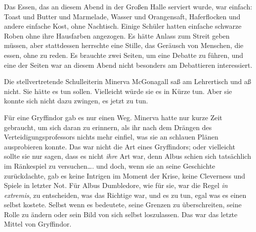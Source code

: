 Das Essen, das an diesem Abend in der Großen Halle serviert wurde, war einfach: Toast und Butter und Marmelade, Wasser und Orangensaft, Haferflocken und andere einfache Kost, ohne Nachtisch. Einige Schüler hatten einfache schwarze Roben ohne ihre Hausfarben angezogen. Es hätte Anlass zum Streit geben müssen, aber stattdessen herrschte eine Stille, das Geräusch von Menschen, die essen, ohne zu reden. Es brauchte zwei Seiten, um eine Debatte zu führen, und eine der Seiten war an diesem Abend nicht besonders am Debattieren interessiert.

Die stellvertretende Schulleiterin Minerva McGonagall saß am Lehrertisch und aß nicht. Sie hätte es tun sollen. Vielleicht würde sie es in Kürze tun. Aber sie konnte sich nicht dazu zwingen, es jetzt zu tun.

Für eine Gryffindor gab es nur einen Weg. Minerva hatte nur kurze Zeit gebraucht, um sich daran zu erinnern, als ihr nach dem Drängen des Verteidigungsprofessors nichts mehr einfiel, was sie an schlauen Plänen ausprobieren konnte. Das war nicht die Art eines Gryffindors; oder vielleicht sollte sie nur sagen, dass es nicht \emph{ihre} Art war, denn Albus schien sich tatsächlich im Ränkespiel zu versuchen…. und doch, wenn sie an seine Geschichte zurückdachte, gab es keine Intrigen im Moment der Krise, keine Cleverness und Spiele in letzter Not. Für Albus Dumbledore, wie für sie, war die Regel \emph{in extremis}, zu entscheiden, was das Richtige war, und es zu tun, egal was es einen selbst kostete. Selbst wenn es bedeutete, seine Grenzen zu überschreiten, seine Rolle zu ändern oder sein Bild von sich selbst loszulassen. Das war das letzte Mittel von Gryffindor.

